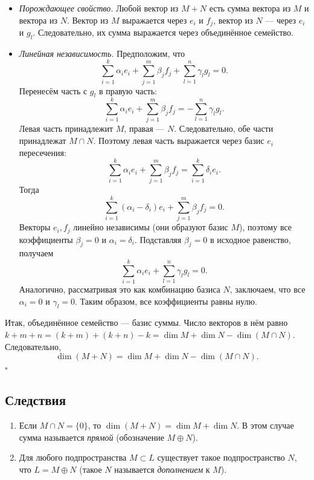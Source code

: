 \documentclass[a4paper,12pt]{article}
\theoremstyle{definition}
\theoremstyle{plain}
\theoremstyle{remark}
\begin{document}
	\begin{itemize}
		\item \textit{Порождающее свойство.} Любой вектор из \( M + N \) есть сумма вектора из \( M \) и вектора из \( N \). Вектор из \( M \) выражается через \( e_i \) и \( f_j \), вектор из \( N \) — через \( e_i \) и \( g_l \). Следовательно, их сумма выражается через объединённое семейство.
		\item \textit{Линейная независимость.} Предположим, что
		\[
		\sum_{i=1}^k \alpha_i e_i + \sum_{j=1}^m \beta_j f_j + \sum_{l=1}^n \gamma_l g_l = 0.
		\]
		Перенесём часть с \( g_l \) в правую часть:
		\[
		\sum_{i=1}^k \alpha_i e_i + \sum_{j=1}^m \beta_j f_j = -\sum_{l=1}^n \gamma_l g_l.
		\]
		Левая часть принадлежит \( M \), правая — \( N \). Следовательно, обе части принадлежат \( M \cap N \). Поэтому левая часть выражается через базис \( e_i \) пересечения:
		\[
		\sum_{i=1}^k \alpha_i e_i + \sum_{j=1}^m \beta_j f_j = \sum_{i=1}^k \delta_i e_i.
		\]
		Тогда
		\[
		\sum_{i=1}^k (\alpha_i - \delta_i) e_i + \sum_{j=1}^m \beta_j f_j = 0.
		\]
		Векторы \( e_i, f_j \) линейно независимы (они образуют базис \( M \)), поэтому все коэффициенты \( \beta_j = 0 \) и \( \alpha_i = \delta_i \). Подставляя \( \beta_j = 0 \) в исходное равенство, получаем
		\[
		\sum_{i=1}^k \alpha_i e_i + \sum_{l=1}^n \gamma_l g_l = 0.
		\]
		Аналогично, рассматривая это как комбинацию базиса \( N \), заключаем, что все \( \alpha_i = 0 \) и \( \gamma_l = 0 \). Таким образом, все коэффициенты равны нулю.
	\end{itemize}
	
	Итак, объединённое семейство — базис суммы. Число векторов в нём равно \( k + m + n = (k + m) + (k + n) - k = \dim M + \dim N - \dim(M \cap N) \). Следовательно,
	\[
	\dim(M + N) = \dim M + \dim N - \dim(M \cap N).
	\]
	\hfill \(\square\)
	
	\subsection{Следствия}
	
	\begin{enumerate}
		\item Если \( M \cap N = \{0\} \), то \( \dim(M + N) = \dim M + \dim N \). В этом случае сумма называется \textit{прямой} (обозначение \( M \oplus N \)).
		\item Для любого подпространства \( M \subset L \) существует такое подпространство \( N \), что \( L = M \oplus N \) (такое \( N \) называется \textit{дополнением} к \( M \)).
	\end{enumerate}
	
\end{document}
